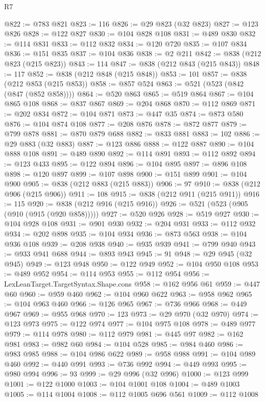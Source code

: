 \begin{lexlean}{R7}
\begin{coremodule}
@822 := @783 @821
@823 := 116
@826 := @29 @823 (@32 @823)
@827 := @123 @826
@828 := @122 @827
@830 := @104 @828 @108
@831 := @489 @830
@832 := @114 @831
@833 := @112 @832
@834 := @120 @720
@835 := @107 @834
@836 := @151 @835
@837 := @104 @836
@838 := @2 @211
@842 := @838 (@212 @823 (@215 @823))
@843 := 114
@847 := @838 (@212 @843 (@215 @843))
@848 := 117
@852 := @838 (@212 @848 (@215 @848))
@853 := 101
@857 := @838 (@212 @853 (@215 @853))
@858 := @857 @524
@863 := @521 (@523 (@842 (@847 (@852 @858))))
@864 := @520 @863
@865 := @519 @864
@867 := @104 @865 @108
@868 := @837 @867
@869 := @204 @868
@870 := @112 @869
@871 := @202 @834
@872 := @104 @871
@873 := @447 @35
@874 := @873 @580
@876 := @104 @874 @108
@877 := @208 @876
@878 := @872 @877
@879 := @799 @878
@881 := @870 @879 @688
@882 := @833 @881
@883 := 102
@886 := @29 @883 (@32 @883)
@887 := @123 @886
@888 := @122 @887
@890 := @104 @888 @108
@891 := @489 @890
@892 := @114 @891
@893 := @112 @892
@894 := @123 @433
@895 := @122 @894
@896 := @104 @895
@897 := @896 @108
@898 := @120 @897
@899 := @107 @898
@900 := @151 @899
@901 := @104 @900
@905 := @838 (@212 @883 (@215 @883))
@906 := 97
@910 := @838 (@212 @906 (@215 @906))
@911 := 108
@915 := @838 (@212 @911 (@215 @911))
@916 := 115
@920 := @838 (@212 @916 (@215 @916))
@926 := @521 (@523 (@905 (@910 (@915 (@920 @858)))))
@927 := @520 @926
@928 := @519 @927
@930 := @104 @928 @108
@931 := @901 @930
@932 := @204 @931
@933 := @112 @932
@934 := @202 @898
@935 := @104 @934
@936 := @873 @563
@938 := @104 @936 @108
@939 := @208 @938
@940 := @935 @939
@941 := @799 @940
@943 := @933 @941 @688
@944 := @893 @943
@945 := 91
@948 := @29 @945 (@32 @945)
@949 := @123 @948
@950 := @122 @949
@952 := @104 @950 @108
@953 := @489 @952
@954 := @114 @953
@955 := @112 @954
@956 := LexLeanTarget.TargetSyntax.Shape.cons
@958 := @162 @956 @61
@959 := @447 @60
@960 := @959 @460
@962 := @104 @960 @622
@963 := @958 @962
@965 := @104 @963 @460
@966 := @126 @965
@967 := @736 @966
@968 := @449 @967
@969 := @955 @968
@970 := 123
@973 := @29 @970 (@32 @970)
@974 := @123 @973
@975 := @122 @974
@977 := @104 @975 @108
@978 := @489 @977
@979 := @114 @978
@980 := @112 @979
@981 := @445 @97
@982 := @162 @981
@983 := @982 @60
@984 := @104 @528
@985 := @984 @460
@986 := @983 @985
@988 := @104 @986 @622
@989 := @958 @988
@991 := @104 @989 @460
@992 := @440 @991
@993 := @736 @992
@994 := @449 @993
@995 := @980 @994
@996 := 93
@999 := @29 @996 (@32 @996)
@1000 := @123 @999
@1001 := @122 @1000
@1003 := @104 @1001 @108
@1004 := @489 @1003
@1005 := @114 @1004
@1008 := @112 @1005 @696 @561
@1009 := @112 @1008

\end{coremodule}
\end{lexlean}
